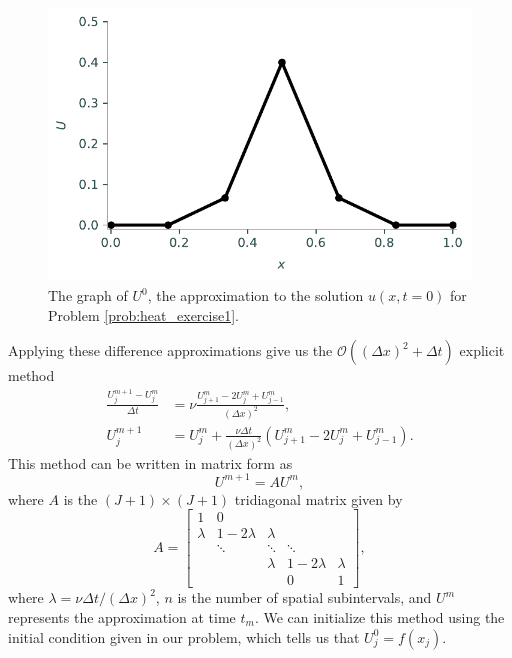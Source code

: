 \begin{figure}
\centering
\includegraphics[width=\textwidth]{figures/heatexercise1a.pdf}
\caption{The graph of $U^{0}$, the approximation to the solution $u(x,t=0)$ for Problem \ref{prob:heat_exercise1}.}
\label{fig:heatexercise1a}
\end{figure}

\noindent
Applying these difference approximations give us the $\mathcal{O}\left( (\Delta x)^2 + \Delta t \right)$ explicit method
\begin{align}
	\frac{U_{j}^{m+1} - U_{j}^{m}}{\Delta t} &= \nu \frac{U_{j+1}^{m}- 2U_{j}^{m} + U_{j-1}^{m} }{(\Delta x)^2} ,\\
	U_{j}^{m+1} &= U_{j}^{m} + \frac{\nu \Delta t}{(\Delta x)^2} (U_{j+1}^{m}- 2U_{j}^{m} + U_{j-1}^{m} ).
	\label{eqn:firstorder_explicit}
\end{align}
This method can be written in matrix form as
\begin{equation}
    U^{m+1} = A U^m,
    \label{heat:eqn:firstorder_matrix}
\end{equation}
where $A$ is the $(J + 1) \times (J + 1)$ tridiagonal matrix given by
\[A = \left[\begin{array}{cccccc}1 & 0 & & & \\ \lambda & 1-2\lambda & \lambda & & \\ & \ddots & \ddots & \ddots & \\ & & \lambda & 1-2\lambda & \lambda \\  &  &  & 0 & 1\end{array}\right],\]
where $\lambda = \nu \Delta t / (\Delta x)^2$, $n$ is the number of spatial subintervals, and $U^m$ represents the approximation at time $t_m$.
We can initialize this method using the initial condition given in our problem, which tells us that $U_{j}^{0} = f(x_j)$.

